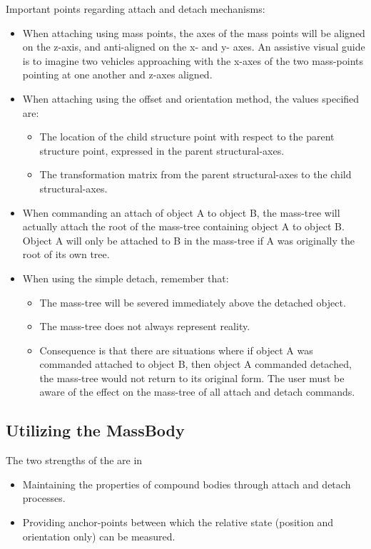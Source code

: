 Important points regarding attach and detach mechanisms:
\begin{itemize}
 \item When attaching using mass points, the axes of the mass points will be
 aligned on the z-axis, and anti-aligned on the x- and y- axes.  An assistive
 visual guide is to imagine two vehicles approaching with the x-axes of the
 two mass-points pointing at one another and z-axes aligned.
 \item When attaching using the offset and orientation method, the values
 specified are:
 \begin{itemize}
  \item The location of the child structure point with respect to the parent
  structure point, expressed in the parent structural-axes.
  \item The transformation matrix from the parent structural-axes to the child
  structural-axes.
 \end{itemize}
 \item When commanding an attach of object A to object B, the mass-tree will
 actually attach the root of the mass-tree containing object A to object B.
 Object A will only be attached to B in the mass-tree if A was originally the
 root of its own tree.
 \item When using the simple detach, remember that:
 \begin{itemize}
  \item The mass-tree will be severed immediately above the detached object.
  \item The mass-tree does not always represent reality.
  \item Consequence is that there are situations where if object A was
  commanded attached to object B, then object A commanded detached, the
  mass-tree would not return to its original form.  The user must be aware of
  the effect on the mass-tree of all attach and detach commands.
 \end{itemize}
\end{itemize}


\subsection{Utilizing the MassBody}
The two strengths of the \ModelDesc are in
\begin{itemize}
 \item Maintaining the properties of compound bodies through attach and detach
 processes.
 \item Providing anchor-points between which the relative state (position and
 orientation only) can be measured.
\end{itemize}

